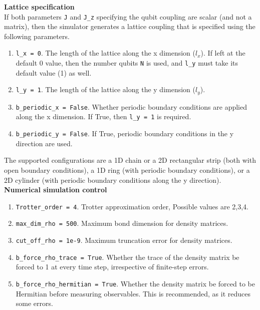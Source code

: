 \documentclass[aps,10pt,pra,twocolumn,groupedaddress,floatfix,superscriptaddress,showpacs,showkeys,amsfonts]{revtex4-2}
\begin{document}
\noindent \textbf{Lattice specification}
\\

If both parameters \verb|J| and \verb|J_z| specifying the qubit coupling are scalar (and not a matrix), then the simulator generates a lattice coupling that is specified using the following parameters.

\begin{enumerate}
\item \verb|l_x = 0|. The length of the lattice along the x dimension ($l_x$). If left at the default 0 value, then the number qubits \verb|N| is used, and \verb|l_y| must take its default value (1) as well.
\item \verb|l_y = 1|. The length of the lattice along the y dimension ($l_y$).  
\item \verb|b_periodic_x = False|. Whether periodic boundary conditions are applied along the x dimension. If True, then \verb|l_y = 1| is required.
\item \verb|b_periodic_y = False|. If True, periodic boundary conditions in the y direction are used.
\end{enumerate}

The supported configurations are a 1D chain or a 2D  rectangular strip (both with open boundary conditions), a 1D ring (with periodic boundary conditions), or a 2D cylinder (with periodic boundary conditions along the y direction).
\\

\noindent \textbf{Numerical simulation control}
\begin{enumerate}

\item \verb|Trotter_order = 4|. Trotter approximation order, Possible values are 2,3,4.

\item \verb|max_dim_rho = 500|. Maximum bond dimension for density matrices.

\item \verb|cut_off_rho = 1e-9|. Maximum truncation error for density matrices.

\item \verb|b_force_rho_trace = True|. Whether the trace of the density matrix be forced to 1 at every time step, irrespective of finite-step errors.

\item \verb|b_force_rho_hermitian = True|. Whether the density matrix be forced to be Hermitian before measuring observables. This is recommended, as it reduces some errors.

\end{enumerate}
\end{document}
